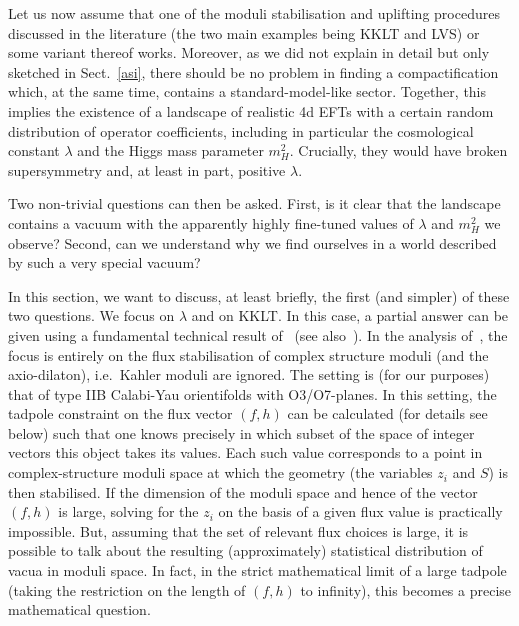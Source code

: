 \documentclass[12pt]{article}
\numberwithin{equation}{section}
\begin{document}
Let us now assume that one of the moduli stabilisation and uplifting procedures discussed in the literature (the two main examples being KKLT and LVS) or some variant thereof works. Moreover, as we did not explain in detail but only sketched in Sect.~\ref{asi}, there should be no problem in finding a compactification which, at the same time, contains a standard-model-like sector. Together, this implies the existence of a landscape of realistic 4d EFTs with a certain random distribution of operator coefficients, including in  particular the cosmological constant $\lambda$ and the Higgs mass parameter $m_H^2$. Crucially, they would have broken supersymmetry and, at least in part, positive $\lambda$.

Two non-trivial questions can then be asked. First, is it clear that the landscape contains a vacuum with the apparently highly fine-tuned values of $\lambda$ and $m_H^2$ we observe? Second, can we understand why we find ourselves in a world described by such a very special vacuum?

In this section, we want to discuss, at least briefly, the first (and simpler) of these two questions. We focus on $\lambda$ and on KKLT. In this case, a partial answer can be given using a fundamental technical result of~\cite{Denef:2004ze} (see also~\cite{Denef:2004cf, Douglas:2003um, Ashok:2003gk}). In the analysis of~\cite{Denef:2004ze}, the focus is entirely on the flux stabilisation of complex structure moduli (and the axio-dilaton), i.e.~Kahler moduli are 
ignored. The setting is (for our purposes) that of type IIB Calabi-Yau orientifolds with O3/O7-planes. In this setting, the tadpole constraint on the flux vector $(f,h)$ can be calculated (for details see below) such that one knows precisely in which subset of the space of integer vectors this object takes its values. Each such value corresponds to a point in complex-structure moduli space at which the geometry (the variables $z_i$ and $S$) is then stabilised. If the dimension of the moduli space and hence of the vector $(f,h)$ is large, solving for the $z_i$ on the basis of a given flux value is practically impossible. But, assuming that the set of relevant flux choices is large, it is possible to talk about the resulting (approximately) statistical distribution of vacua in moduli space. In fact, in the strict mathematical limit of a large tadpole (taking the restriction on the length of $(f,h)$ to infinity), this becomes a precise mathematical question. 
\end{document}
